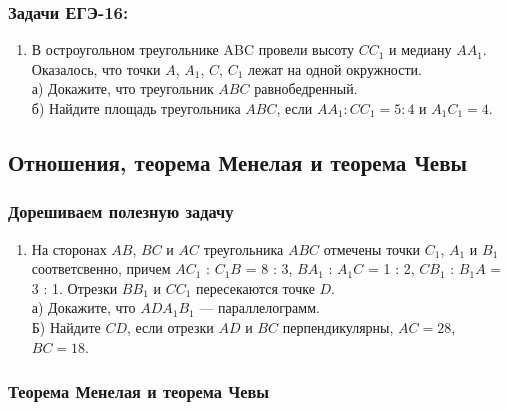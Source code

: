 \documentclass[12pt]{article}
\begin{document}
\subsubsection*{Задачи ЕГЭ-16:}
\begin{enumerate}[start=1,label={\itshape\bfseries \arabic*.}]
 \item В остроугольном треугольнике ABC провели высоту $CC_1$ и медиану $AA_1$. Оказалось, что точки $A$, $A_1$, $C$, $C_1$ лежат на одной окружности.\\
а) Докажите, что треугольник $ABC$ равнобедренный.\\
б) Найдите площадь треугольника $ABC$, если $AA_1 : CC_1 = 5 : 4$ и $A_1C_1 = 4$.
\end{enumerate}






    \subsection{Отношения, теорема Менелая и теорема Чевы}
    \subsubsection*{Дорешиваем полезную задачу}

    \begin{enumerate}[start=1,label={\itshape\bfseries \arabic*.}]

    \item На сторонах $AB$, $BC$ и $AC$ треугольника $ABC$ отмечены точки $C_1$, $A_1$ и $B_1$ соответсвенно, причем $AC_1$ : $C_1B$ = 8 : 3, $BA_1$ : $A_1 C $ = 1 : 2, $CB_1$ : $B_1 A$ = 3 : 1. Отрезки $BB_1$ и $CC_1$ пересекаются точке $D$.\\
а) Докажите, что $A D A_1 B_1$ — параллелограмм.\\
Б) Найдите $CD$, если отрезки $AD$ и $BC$ перпендикулярны, $AC = 28$, $BC = 18$.

    \end{enumerate}

    \subsubsection*{Теорема Менелая и теорема Чевы}
\end{document}
